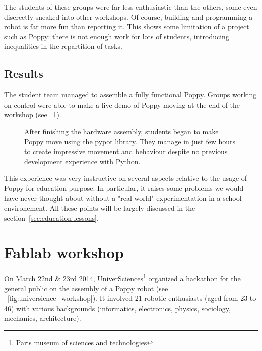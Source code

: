 The students of these groups were far less enthusiastic than the others, some even discreetly sneaked into other workshops. Of course, building and programming a robot is  far more fun than reporting it. This shows some limitation of a project such as Poppy: there is not enough work for lots of students, introducing inequalities in the repartition of tasks.

\subsection{Results} %

The student team managed to assemble a fully functional Poppy. Groups working on control were able to make a live demo of Poppy moving at the end of the workshop (see \figurename~\ref{fig:saintonge_demonstration}).

\begin{figure}[tb]
\centering
    \hfill
    \caption{After finishing the hardware assembly, students began to make Poppy move using the pypot library. They manage in just few hours to create impressive movement and behaviour despite no previous development experience with Python.}
    \label{fig:saintonge_demonstration}
\end{figure}

This experience was very instructive on several aspects relative to the usage of Poppy for education purpose. In particular, it raises some problems we would have never thought about without a "real world" experimentation in a school environement. All these points will be largely discussed in the section~\ref{sec:education-lessons}.

\newpage
\section{Fablab workshop} %
\label{sec:poppy_universience}

On March 22nd \& 23rd 2014, UniverSciences\footnote{Paris museum of sciences and technologies} organized a hackathon for the general public on the assembly of a Poppy robot (see \figurename~\ref{fig:universience_workshop}).
It involved 21 robotic enthusiasts (aged from 23 to 46) with various backgrounds (informatics, electronics, physics, sociology, mechanics, architecture).

